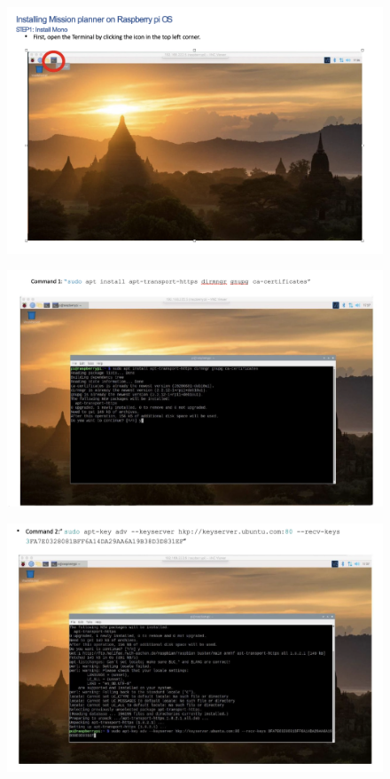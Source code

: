 \newpage

\begin{figure}[h!]
\centering
\includegraphics[width=\columnwidth]{./Figures/config_img1_qc.png}
\end{figure}

\begin{figure}[h!]
\centering
\includegraphics[width=\columnwidth]{./Figures/config_img2.png}
\end{figure}

\begin{figure}[h!]
\centering
\includegraphics[width=\columnwidth]{./Figures/config_img3.png}
\end{figure}

